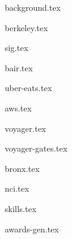 \documentclass[11pt]{article}
\begin{document}
{background.tex}


{berkeley.tex}


{sig.tex}

{bair.tex}

{uber-eats.tex}

{aws.tex}

{voyager.tex}

{voyager-gates.tex}

{bronx.tex}

{nci.tex}


{skills.tex}


{awards-gen.tex}
\end{document}
